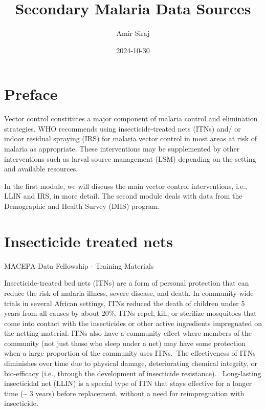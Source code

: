 \documentclass[
  letterpaper,
  DIV=11,
  numbers=noendperiod]{scrreprt}
\title{Secondary Malaria Data Sources}
\author{Amir Siraj}
\date{2024-10-30}
\renewcommand*\contentsname{Table of contents}
\newcommand\contentsname{Table of contents}
\begin{document}
\maketitle

\renewcommand*\contentsname{Table of contents}
{
\hypersetup{linkcolor=}
\setcounter{tocdepth}{2}
\tableofcontents
}


\chapter*{Preface}\label{preface}


Vector control constitutes a major component of malaria control and
elimination strategies. WHO recommends using insecticide-treated nets
(ITNs) and/ or indoor residual spraying (IRS) for malaria vector control
in most areas at risk of malaria as appropriate. These interventions may
be supplemented by other interventions such as larval source management
(LSM) depending on the setting and available resources.

In the first module, we will discuss the main vector control
interventions, i.e., LLIN and IRS, in more detail. The second module
deals with data from the Demographic and Health Survey (DHS) program.


\chapter{Insecticide treated nets}\label{insecticide-treated-nets}

MACEPA Data Fellowship - Training Materials

\hfill\break

Insecticide-treated bed nets (ITNs) are a form of personal protection
that can reduce the risk of malaria illness, severe disease, and death.
In community-wide trials in several African settings, ITNs reduced the
death of children under 5 years from all causes by about 20\%. ITNs
repel, kill, or sterilize mosquitoes that come into contact with the
insecticides or other active ingredients impregnated on the netting
material. ITNs also have a community effect where members of the
community (not just those who sleep under a net) may have some
protection when a large proportion of the community uses ITNs.~The
effectiveness of ITNs diminishes over time due to physical damage,
deteriorating chemical integrity, or bio-efficacy (i.e., through the
development of insecticide resistance).~ Long-lasting insecticidal net
(LLIN) is a special type of ITN that stays effective for a longer time
(\textasciitilde{} 3 years) before replacement, without a need for
reimpregnation with insecticide.~
\end{document}
